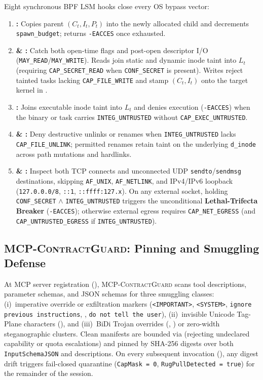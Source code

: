 \documentclass[10pt,twocolumn,letterpaper]{article}
\newcommand{\guard}{\textsc{MCP-ContractGuard}}
\newcommand{\code}[1]{\texttt{\small #1}}
\begin{document}
Eight synchronous BPF LSM hooks close every OS bypass vector:
\begin{enumerate}
  \item \textbf{:} Copies parent $(C_t, I_t, P_t)$ into the newly allocated child  and decrements \code{spawn\_budget}; returns \code{-EACCES} once exhausted.
  \item \textbf{ \& :} Catch both open-time flags and post-open descriptor I/O (\code{MAY\_READ}/\code{MAY\_WRITE}). Reads join static and dynamic inode taint into $L_t$ (requiring \code{CAP\_SECRET\_READ} when \code{CONF\_SECRET} is present). Writes reject tainted tasks lacking \code{CAP\_FILE\_WRITE} and stamp $(C_t, I_t)$ onto the target kernel  in .
  \item \textbf{:} Joins executable inode taint into $L_t$ and denies execution (\code{-EACCES}) when the binary or task carries \code{INTEG\_UNTRUSTED} without \code{CAP\_EXEC\_UNTRUSTED}.
  \item \textbf{ \& :} Deny destructive unlinks or renames when \code{INTEG\_UNTRUSTED} lacks \code{CAP\_FILE\_UNLINK}; permitted renames retain  taint on the underlying \code{d\_inode} across path mutations and hardlinks.
  \item \textbf{ \& :} Inspect both TCP connects and unconnected UDP \code{sendto}/\code{sendmsg} destinations, skipping \code{AF\_UNIX}, \code{AF\_NETLINK}, and IPv4/IPv6 loopback (\code{127.0.0.0/8}, \code{::1}, \code{::ffff:127.x}). On any external socket, holding \code{CONF\_SECRET} $\land$ \code{INTEG\_UNTRUSTED} triggers the unconditional \textbf{Lethal-Trifecta Breaker} (\code{-EACCES}); otherwise external egress requires \code{CAP\_NET\_EGRESS} (and \code{CAP\_UNTRUSTED\_EGRESS} if \code{INTEG\_UNTRUSTED}).
\end{enumerate}

\subsection{\guard{}: Pinning and Smuggling Defense}
\label{sec:mcp}

At MCP server registration (), \guard{} scans tool descriptions, parameter schemas, and JSON schemas for three smuggling classes: (i)~imperative override or exfiltration markers (\code{<IMPORTANT>}, \code{<SYSTEM>}, \code{ignore previous instructions}, , \code{do not tell the user}), (ii)~invisible Unicode Tag-Plane characters (), and (iii)~BiDi Trojan overrides (, ) or zero-width steganographic clusters. Clean manifests are bounded via  (rejecting undeclared capability or quota escalations) and pinned by SHA-256 digests over both \code{InputSchemaJSON} and descriptions. On every subsequent invocation (), any digest drift triggers fail-closed quarantine (\code{CapMask = 0}, \code{RugPullDetected = true}) for the remainder of the session.
\end{document}
